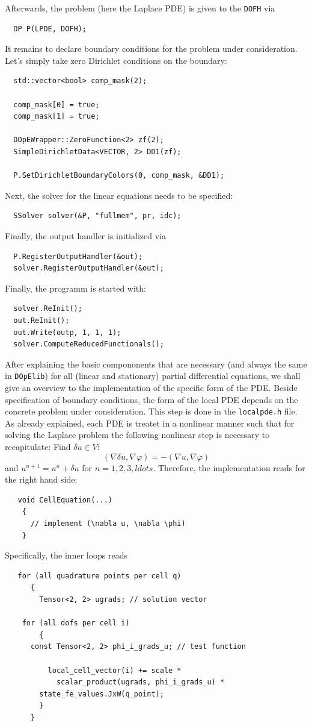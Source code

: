 \documentclass[prodmode,acmtoms]{acmsmall}
\numberwithin{equation}{section}
\renewcommand{\phi}{\varphi}
\newcommand{\dope}{\texttt{DOpElib}}
\begin{document}
Afterwards, the problem (here the Laplace PDE) is given to the \texttt{DOFH} via
\begin{lstlisting}
  OP P(LPDE, DOFH);
\end{lstlisting}
It remains to declare boundary conditions for the problem under consideration. 
Let's simply take zero Dirichlet conditions on the boundary:
\begin{lstlisting}
  std::vector<bool> comp_mask(2);

  comp_mask[0] = true;
  comp_mask[1] = true;

  DOpEWrapper::ZeroFunction<2> zf(2);
  SimpleDirichletData<VECTOR, 2> DD1(zf);

  P.SetDirichletBoundaryColors(0, comp_mask, &DD1);
\end{lstlisting}
Next, the solver for the linear equations needs to be specified:
\begin{lstlisting}
  SSolver solver(&P, "fullmem", pr, idc);
\end{lstlisting}
Finally, the output handler is initialized via
\begin{lstlisting}
  P.RegisterOutputHandler(&out);
  solver.RegisterOutputHandler(&out);
\end{lstlisting}
Finally, the programm is started with:
\begin{lstlisting}
  solver.ReInit();
  out.ReInit();
  out.Write(outp, 1, 1, 1);
  solver.ComputeReducedFunctionals();
\end{lstlisting}
After explaining the basic compononents that are necessary (and always the same in \dope) 
for all  (linear and stationary) partial differential equations, we shall give 
an overview to the implementation of the specific form of the PDE. 
Beside specification of boundary conditions, the form of the local PDE depends 
on the concrete problem under consideration. 
This step is done in the \texttt{localpde.h} file. As already explained,
each PDE is treatet in a nonlinear manner such that for solving 
the Laplace problem the following nonlinear step is necessary to recapitulate:
Find $\delta u\in V$:
\[
(\nabla \delta u, \nabla \phi) = -(\nabla u, \nabla \phi) 
\]
and $u^{n+1} = u^n + \delta u$ for $n=1,2,3,ldots$.
Therefore, the implementation reads for the right hand side:
\begin{lstlisting}
   void CellEquation(...)
    {
      // implement (\nabla u, \nabla \phi) 
    }
\end{lstlisting}
Specifically, the inner loops reads
\begin{lstlisting}
   for (all quadrature points per cell q)
      {
        Tensor<2, 2> ugrads; // solution vector
 
	for (all dofs per cell i)
        {
	  const Tensor<2, 2> phi_i_grads_u; // test function

          local_cell_vector(i) += scale * 
            scalar_product(ugrads, phi_i_grads_u) *
	    state_fe_values.JxW(q_point);
        }
      }
\end{lstlisting}
\end{document}
